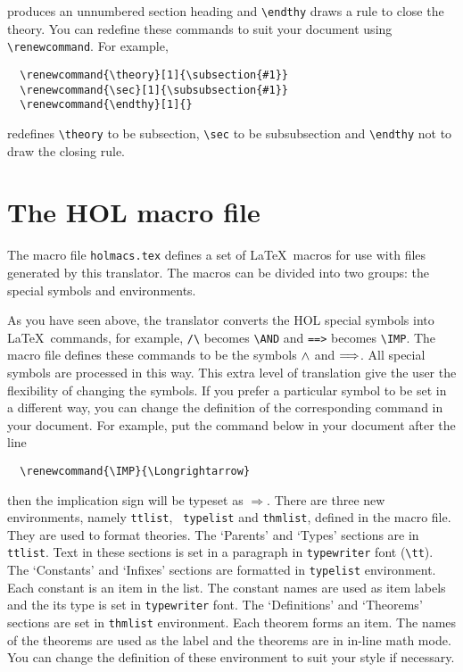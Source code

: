 produces an unnumbered section heading and \verb|\endthy| draws a rule
to close the theory. You can redefine these commands to suit your
document using \verb|\renewcommand|. For example, 
\begin{verbatim}
  \renewcommand{\theory}[1]{\subsection{#1}}
  \renewcommand{\sec}[1]{\subsubsection{#1}}
  \renewcommand{\endthy}[1]{}
\end{verbatim}
 redefines \verb|\theory| to be subsection, \verb|\sec| to be
subsubsection and \verb|\endthy| not to draw the closing rule.

\section{The HOL macro file}

The macro file {\tt holmacs.tex} defines a set of \LaTeX\ macros for
use with files generated by this translator. The macros can be divided
into two groups: the special symbols and environments.

As you have seen above, the translator converts the HOL special
symbols into \LaTeX\ commands, for example, \verb|/\| becomes
\verb|\AND| and \verb|==>| becomes \verb|\IMP|. The macro file defines
these commands to be the symbols $\AND$ and $\IMP$. All special
symbols are processed in this way. This extra level of translation
give the user the flexibility of changing the symbols. If you prefer a
particular symbol to be set in a different way, you can change the
definition of the corresponding command in your document. For example,
put the command below in your document after the \verb||
line
\begin{verbatim}
  \renewcommand{\IMP}{\Longrightarrow}
\end{verbatim}
then the implication sign will be typeset as $\Longrightarrow$.
There are three new environments, namely {\tt ttlist}, {\tt
typelist} and {\tt thmlist}, defined in the macro file. They are used to format theories. The
`Parents' and `Types' sections are in {\tt ttlist}. Text in these
sections is set in a paragraph in {\tt typewriter} font (\verb|\tt|).
The `Constants' and `Infixes' sections are formatted in {\tt typelist}
environment. Each constant is an item in the list.
The constant names are used as item labels
 and the its type is set in {\tt typewriter} font. The `Definitions' and
`Theorems' sections are set in {\tt thmlist} environment. Each theorem
forms an item. The names of the theorems are used as the label and the
theorems are in in-line math mode. You can change the definition of
these environment to suit your style if necessary.

